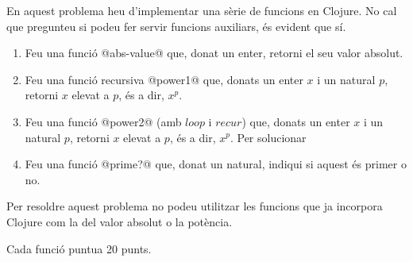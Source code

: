 
\Statement

En aquest problema heu d’implementar una sèrie de funcions en Clojure.
No cal que pregunteu si podeu fer servir funcions auxiliars, és evident que sí.

\begin{enumerate}

\item Feu una funció @abs-value@ que,
donat un enter, retorni el seu valor absolut.

\item Feu una funció recursiva @power1@ que,
donats un enter $x$ i un natural $p$, retorni $x$ elevat a $p$, és a dir, $x^p$.

\item Feu una funció @power2@ (amb $loop$ i $recur$) que,
donats un enter $x$ i un natural $p$, retorni $x$ elevat a $p$, és a dir, $x^p$. Per solucionar

\item Feu una funció @prime?@ que,
donat un natural, indiqui si aquest és primer o no.

\end{enumerate}

\Observations

Per resoldre aquest problema no podeu utilitzar les funcions que ja incorpora Clojure com la del valor absolut o la potència.

\Scoring

Cada funció puntua 20 punts.

\SampleOneCol


